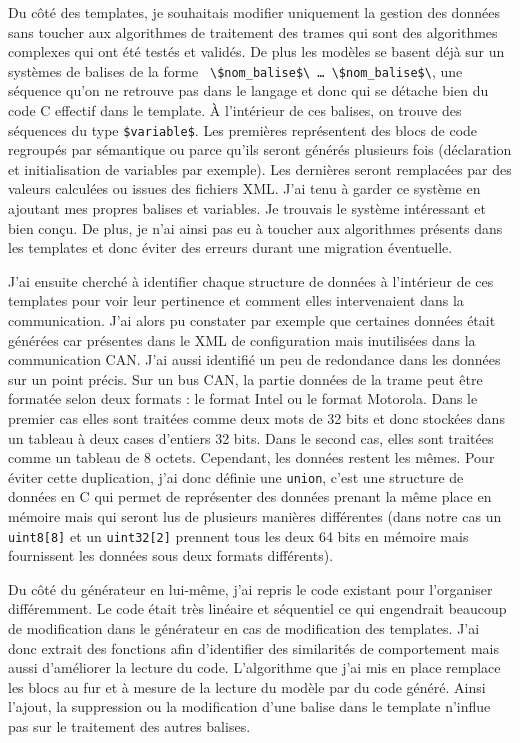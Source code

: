Du côté des templates, je souhaitais modifier uniquement la gestion des données
sans toucher aux algorithmes de traitement des trames qui sont des algorithmes
complexes qui ont été testés et validés. De plus les modèles se basent déjà sur
un systèmes de balises de la forme {\tt
\textbackslash\$nom\_balise\$\textbackslash\- \ldots\-
\textbackslash\$nom\_balise\$\textbackslash}, une séquence qu'on ne retrouve pas
dans le langage et donc qui se détache bien du code C effectif dans le template.
À l'intérieur de ces balises, on trouve des séquences du type {\tt \$variable\$}.
Les premières représentent des blocs de code regroupés par sémantique ou parce
qu'ils seront générés plusieurs fois (déclaration et initialisation de variables
par exemple). Les dernières seront remplacées par des valeurs calculées ou
issues des fichiers XML. J'ai tenu à garder ce système en ajoutant mes propres
balises et variables. Je trouvais le système intéressant et bien conçu. De plus,
je n'ai ainsi pas eu à toucher aux algorithmes présents dans les templates et
donc éviter des erreurs durant une migration éventuelle.

J'ai ensuite cherché à identifier chaque structure de données à l'intérieur de
ces templates pour voir leur pertinence et comment elles intervenaient dans la
communication. J'ai alors pu constater par exemple que certaines données était
générées car présentes dans le XML de configuration mais inutilisées dans la
communication CAN. J'ai aussi identifié un peu de redondance dans les données
sur un point précis. Sur un bus CAN, la partie données de la trame peut être
formatée selon deux formats : le format Intel ou le format Motorola. Dans le
premier cas elles sont traitées comme deux mots de 32 bits et donc stockées dans
un tableau à deux cases d'entiers 32 bits. Dans le second cas, elles sont
traitées comme un tableau de 8 octets. Cependant, les données restent les mêmes.
Pour éviter cette duplication, j'ai donc définie une {\tt union}, c'est une
structure de données en C qui permet de représenter des données prenant la même
place en mémoire mais qui seront lus de plusieurs manières différentes (dans
notre cas un {\tt uint8[8]} et un {\tt uint32[2]} prennent tous les deux 64 bits
en mémoire mais fournissent les données sous deux formats différents).

Du côté du générateur en lui-même, j'ai repris le code existant pour l'organiser
différemment. Le code était très linéaire et séquentiel ce qui engendrait
beaucoup de modification dans le générateur en cas de modification des
templates. J'ai donc extrait des fonctions afin d'identifier des similarités de
comportement mais aussi d'améliorer la lecture du code. L'algorithme que j'ai
mis en place remplace les blocs au fur et à mesure de la lecture du modèle par
du code généré. Ainsi l'ajout, la suppression ou la modification d'une balise
dans le template n'influe pas sur le traitement des autres balises.


